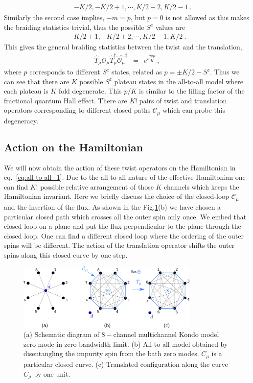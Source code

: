 \documentclass[10pt]{iopart}
\begin{document}
\begin{eqnarray}
&&-K/2,-K/2+1,\cdots,K/2-2,K/2-1~.
\end{eqnarray}
Similarly the second case implies, $-m=p$, but $p=0$ is not allowed as this makes the braiding statistics trivial, thus the possible $S^z$ values are 
\begin{eqnarray}
-K/2+1,-K/2+2,\cdots,K/2-1,K/2~.
\end{eqnarray}
This gives the general braiding statistics between the twist and the translation,
\begin{eqnarray}
\hat{T}_{\mu}\hat{\mathcal{O}_{\mu}} \hat{T}^{\dagger}_{\mu}\hat{\mathcal{O}_{\mu}}^{\dagger} &=& e^{i\frac{2\pi p}{K}}~,
\end{eqnarray}
where $p$ corresponds to different $S^z$ states, related as $p=\pm K/2-S^z$. Thus we can see that there are $K$ possible $S^z$ plateau states in the all-to-all model where each plateau is $K$ fold degenerate. This $p/K$ is similar to the filling factor of the fractional quantum Hall effect. There are $K!$ pairs of twist and translation operators corresponding to different closed paths $\mathcal{C}_{\mu}$ which can probe this degeneracy.

\subsection{Action on the Hamiltonian}
We will now obtain the action of these twist operators on the Hamiltonian in eq.~\ref{eq:all-to-all_1}. Due to the all-to-all nature of the effective Hamiltonian one can find $K!$ possible relative arrangement of those $K$ channels which keeps the Hamiltonian invariant. Here we briefly discuss the choice of the closed-loop $\mathcal{C}_{\mu}$ and the insertion of the flux. As shown in the Fig.\ref{fig:stargraph-to-alltoall}(b) we have chosen a particular closed path which crosses all the outer spin only once. We embed that closed-loop on a plane and put the flux perpendicular to the plane through the closed loop. One can find a different closed loop where the ordering of the outer spins will be different. The action of the translation operator shifts the outer spins along this closed curve by one step.

\begin{figure}[htpb]
	\centering
	\includegraphics[width=0.8\textwidth]{stargraphtoalltoall.png}
	\caption{(a) Schematic diagram of $8-$channel multichannel Kondo model zero mode in zero bandwidth limit. (b) All-to-all model obtained by disentangling the impurity spin from the bath zero modes. $C_{\mu}$ is a particular closed curve. (c) Translated configuration along the curve $C_{\mu}$ by one unit.}
	\label{fig:stargraph-to-alltoall}
\end{figure}
\end{document}
